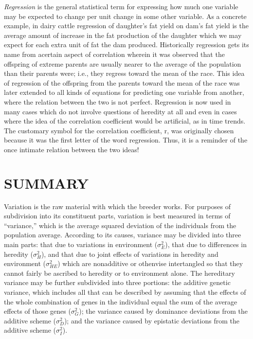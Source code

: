 {
\textit{Regression} is the general statistical term for expressing how much
one variable may be expected to change per unit change in some other
variable. As a concrete example, in dairy cattle regression of daughter's
fat yield on dam's fat yield is the average amount of increase in the fat
production of the daughter which we may expect for each extra unit of
fat the dam produced. Historically regression gets its name from acertain
aspect of correlation wherein it was observed that the offspring of
extreme parents are usually nearer to the average of the population
than their parents were; i.e., they regress toward the mean of the race.
This idea of regression of the offspring from the parents toward the
mean of the race was later extended to all kinds of equations for predicting
one variable from another, where the relation between the two
is not perfect. Regression is now used in many cases which do not
involve questions of heredity at all and even in cases where the idea of
the correlation coefficient would be artificial, as in time trends. The customary
symbol for the correlation coefficient, r, was originally chosen
because it was the first letter of the word regression. Thus, it is a
reminder of the once intimate relation between the two ideas!

\section*{SUMMARY}

Variation is the raw material with which the breeder works. For
purposes of subdivision into its constituent parts, variation is best measured
in terms of ``variance,'' which is the average squared deviation of
the individuals from the population average. According to its causes,
variance may be divided into three main parts: that due to variations in
environment ($\sigma_E^2$), that due to differences in heredity ($\sigma_H^2$), and that
due to joint effects of variations in heredity and environment ($\sigma_{HE}^2$)
which are nonadditive or othenvise intertangled so that they cannot
fairly be ascribed to heredity or to environment alone. The hereditary
variance may be further subdivided into three portions: the additive
genetic variance, which includes all that can be described by assuming
that the effects of the whole combination of genes in the individual
equal the sum of the average effects of those genes ($\sigma_G^2$); the variance
caused by dominance deviations from the additive scheme ($\sigma_D^2$); and
the variance caused by epistatic deviations from the additive scheme
($\sigma_I^2$).

}
